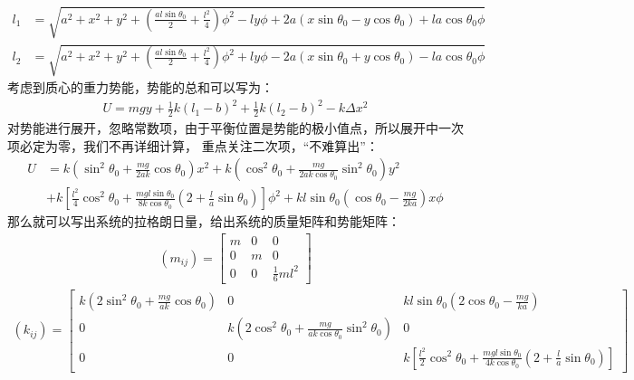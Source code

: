 \documentclass[a4paper]{ctexart}
\begin{document}
    \begin{align}
        l_{1}&= \sqrt{a^{2} + x^{2} + y^{2} + \left(\frac{al\sin\theta_{0}}{2} + \frac{l^{2}}{4}\right)\phi^{2} - ly\phi + 2a(x\sin\theta_{0} - y\cos\theta_{0}) + la\cos\theta_{0}\phi}\\
        l_{2}&= \sqrt{a^{2} + x^{2} + y^{2} + \left(\frac{al\sin\theta_{0}}{2} + \frac{l^{2}}{4}\right)\phi^{2} + ly\phi - 2a(x\sin\theta_{0} + y\cos\theta_{0}) - la\cos\theta_{0}\phi}
    \end{align}
    考虑到质心的重力势能，势能的总和可以写为：
    \begin{align}
        U = mgy + \frac{1}{2}k(l_{1} - b)^{2} + \frac{1}{2}k(l_{2} - b)^{2} - k\Delta x^{2}
    \end{align}
    对势能进行展开，忽略常数项，由于平衡位置是势能的极小值点，所以展开中一次项必定为零，我们不再详细计算，
    重点关注二次项，“不难算出”：
    \begin{align}
        U &= k\left(\sin^{2}\theta_{0} + \frac{mg}{2ak}\cos\theta_{0}\right)x^{2} + k\left(\cos^{2}\theta_{0} + \frac{mg}{2ak\cos\theta_{0}}\sin^{2}\theta_{0}\right)y^{2}\\
        &+ k\left[\frac{l^{2}}{4}\cos^{2}\theta_{0} + \frac{mgl\sin\theta_{0}}{8k\cos\theta_{0}}\left(2 + \frac{l}{a}\sin\theta_{0}\right)\right]\phi^{2} + kl\sin\theta_{0}\left(\cos\theta_{0} - \frac{mg}{2ka}\right)x\phi
    \end{align}
    那么就可以写出系统的拉格朗日量，给出系统的质量矩阵和势能矩阵：
    \begin{gather}
        (m_{ij}) = 
        \begin{bmatrix}
            m & 0 & 0\\
            0 & m & 0\\
            0 & 0 & \frac{1}{6}ml^{2}
        \end{bmatrix}
    \end{gather}
    \begin{gather}
        (k_{ij}) = 
        \begin{bmatrix}
            k\left(2\sin^{2}\theta_{0} + \frac{mg}{ak}\cos\theta_{0}\right) & 0 & kl\sin\theta_{0}\left(2\cos\theta_{0} - \frac{mg}{ka}\right)\\
            0 & k\left(2\cos^{2}\theta_{0} + \frac{mg}{ak\cos\theta_{0}}\sin^{2}\theta_{0}\right) & 0\\
            0 & 0 & k\left[\frac{l^{2}}{2}\cos^{2}\theta_{0} + \frac{mgl\sin\theta_{0}}{4k\cos\theta_{0}}\left(2 + \frac{l}{a}\sin\theta_{0}\right)\right]
        \end{bmatrix}
    \end{gather}
\end{document}
